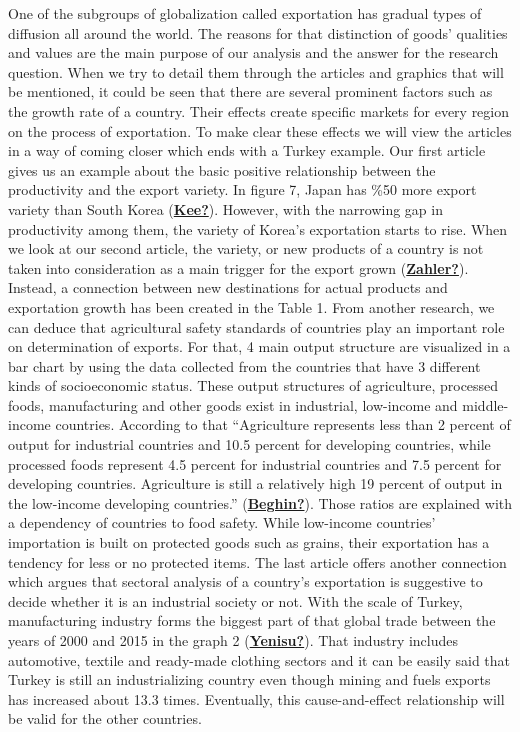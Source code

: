 \documentclass[
  12pt,
]{article}
\begin{document}
One of the subgroups of globalization called exportation has gradual types of diffusion all around the world. The reasons for that distinction of goods' qualities and values are the main purpose of our analysis and the answer for the research question. When we try to detail them through the articles and graphics that will be mentioned, it could be seen that there are several prominent factors such as the growth rate of a country. Their effects create specific markets for every region on the process of exportation.
To make clear these effects we will view the articles in a way of coming closer which ends with a Turkey example. Our first article gives us an example about the basic positive relationship between the productivity and the export variety. In figure 7, Japan has \%50 more export variety than South Korea (\protect\hyperlink{ref-Kee}{\textbf{Kee?}}). However, with the narrowing gap in productivity among them, the variety of Korea's exportation starts to rise. When we look at our second article, the variety, or new products of a country is not taken into consideration as a main trigger for the export grown (\protect\hyperlink{ref-Zahler}{\textbf{Zahler?}}). Instead, a connection between new destinations for actual products and exportation growth has been created in the Table 1. From another research, we can deduce that agricultural safety standards of countries play an important role on determination of exports. For that, 4 main output structure are visualized in a bar chart by using the data collected from the countries that have 3 different kinds of socioeconomic status. These output structures of agriculture, processed foods, manufacturing and other goods exist in industrial, low-income and middle-income countries. According to that ``Agriculture represents less than 2 percent of output for industrial countries and 10.5 percent for developing countries, while processed foods represent 4.5 percent for industrial countries and 7.5 percent for developing countries. Agriculture is still a relatively high 19 percent of output in the low-income developing countries.'' (\protect\hyperlink{ref-Beghin}{\textbf{Beghin?}}). Those ratios are explained with a dependency of countries to food safety. While low-income countries' importation is built on protected goods such as grains, their exportation has a tendency for less or no protected items. The last article offers another connection which argues that sectoral analysis of a country's exportation is suggestive to decide whether it is an industrial society or not. With the scale of Turkey, manufacturing industry forms the biggest part of that global trade between the years of 2000 and 2015 in the graph 2 (\protect\hyperlink{ref-Yenisu}{\textbf{Yenisu?}}). That industry includes automotive, textile and ready-made clothing sectors and it can be easily said that Turkey is still an industrializing country even though mining and fuels exports has increased about 13.3 times. Eventually, this cause-and-effect relationship will be valid for the other countries.
\end{document}
